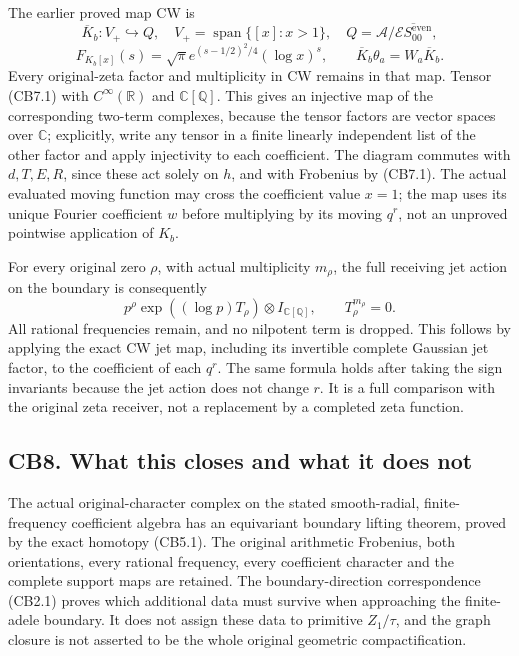 The earlier proved map CW is \[
\overline K_b:V_+\hookrightarrow Q,
\quad V_+=\operatorname{span}\{[x]:x>1\},
\quad Q=\mathcal A/\overline{\mathcal E S_{00}^{\mathrm{even}}},
\] \[
F_{K_b[x]}(s)=\sqrt\pi e^{(s-1/2)^2/4}(\log x)^s,
\qquad \overline K_b\theta_a=W_a\overline K_b.
\tag{CB7.1}
\] Every original-zeta factor and multiplicity in CW remains in that
map. Tensor (CB7.1) with \(C^\infty(\mathbb R)\) and
\(\mathbb C[\mathbb Q]\). This gives an injective map of the
corresponding two-term complexes, because the tensor factors are vector
spaces over \(\mathbb C\); explicitly, write any tensor in a finite
linearly independent list of the other factor and apply injectivity to
each coefficient. The diagram commutes with \(d,T,E,R\), since these act
solely on \(h\), and with Frobenius by (CB7.1). The actual evaluated
moving function may cross the coefficient value \(x=1\); the map uses
its unique Fourier coefficient \(w\) before multiplying by its moving
\(q^r\), not an unproved pointwise application of \(K_b\).

For every original zero \(\rho\), with actual multiplicity \(m_\rho\),
the full receiving jet action on the boundary is consequently \[
p^\rho\exp((\log p)T_\rho)\otimes I_{\mathbb C[\mathbb Q]},
\qquad T_\rho^{m_\rho}=0.
\tag{CB7.2}
\] All rational frequencies remain, and no nilpotent term is dropped.
This follows by applying the exact CW jet map, including its invertible
complete Gaussian jet factor, to the coefficient of each \(q^r\). The
same formula holds after taking the sign invariants because the jet
action does not change \(r\). It is a full comparison with the original
zeta receiver, not a replacement by a completed zeta function.

\subsection{CB8. What this closes and what it does
not}\label{cb8.-what-this-closes-and-what-it-does-not}

The actual original-character complex on the stated smooth-radial,
finite-frequency coefficient algebra has an equivariant boundary lifting
theorem, proved by the exact homotopy (CB5.1). The original arithmetic
Frobenius, both orientations, every rational frequency, every
coefficient character and the complete support maps are retained. The
boundary-direction correspondence (CB2.1) proves which additional data
must survive when approaching the finite-adele boundary. It does not
assign these data to primitive \(Z_1/\tau\), and the graph closure is
not asserted to be the whole original geometric compactification.


